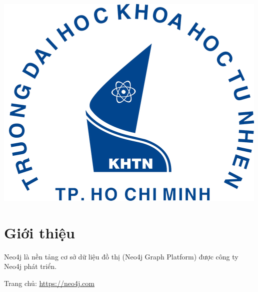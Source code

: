 \begin{titlepage}



\includegraphics{logo/rsz_3logo-khtn.png}\\[1cm] %
 

\vfill %

\end{titlepage}


\section{Giới thiệu}
Neo4j là nền tảng cơ sở dữ liệu đồ thị (Neo4j Graph Platform) được công ty Neo4j phát triển. 

Trang chủ:  \url{https://neo4j.com}   

